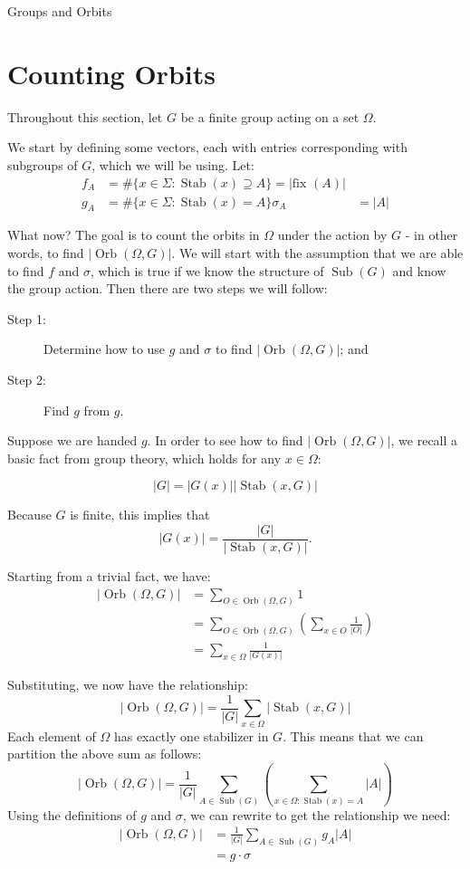 \documentclass[12pt]{pom_thesis}
\newcommand{\fix}{\text{fix }}
\DeclareMathOperator{\sub}{Sub}
\DeclareMathOperator{\stab}{Stab}
\DeclareMathOperator{\orb}{Orb}
\begin{document}
\begin{chapter}{Groups and Orbits}
\section{Counting Orbits}
Throughout this section, let $G$ be a finite group acting on a set $\Omega$.

We start by defining some vectors, each with entries corresponding with subgroups of $G$, which we will be using. Let:
\begin{align*}
f_A &= \#\{x \in \Sigma: \stab(x) \supseteq A\} = |\fix(A)|\\
g_A &= \#\{x \in \Sigma: \stab(x) = A\}
\sigma_A &= |A|
\end{align*}

What now? The goal is to count the orbits in $\Omega$ under the action by $G$ - in other words, to find $|\orb(\Omega, G)|$. We will start with the assumption that we are able to find $f$ and $\sigma$, which is true if we know the structure of $\sub(G)$ and know the group action. Then there are two steps we will follow:
\begin{description}
\item[Step 1:] Determine how to use $g$ and $\sigma$ to find $|\orb(\Omega, G)|$; and
\item[Step 2:] Find $g$ from $g$.
\end{description}

Suppose we are handed $g$. In order to see how to find $|\orb(\Omega, G)|$, we recall a basic fact from group theory, which holds for any $x \in \Omega$:
\begin{fact}
\[|G| = |G(x)||\stab(x, G)|\]
\end{fact}
Because $G$ is finite, this implies that \[|G(x)| = \frac{|G|}{|\stab(x, G)|}.\]

Starting from a trivial fact, we have:
\begin{align*}
|\orb(\Omega, G)| &= \sum_{O \in \orb(\Omega, G)}1\\
&= \sum_{O \in \orb(\Omega, G)}\left(\sum_{x \in O}\frac{1}{|O|}\right)\\
&= \sum_{x \in \Omega}\frac{1}{|G(x)|}
\end{align*}

Substituting, we now have the relationship:
\[
|\orb(\Omega, G)| = \frac{1}{|G|}\sum_{x \in \Omega}|\stab(x, G)|
\]
Each element of $\Omega$ has exactly one stabilizer in $G$. This means that we can partition the above sum as follows:
\[
|\orb(\Omega, G)| = \frac{1}{|G|}\sum_{A \in \sub(G)}\left(\sum_{x \in \Omega: \stab(x) = A}|A|\right)
\]
Using the definitions of $g$ and $\sigma$, we can rewrite to get the relationship we need:
\begin{align*}
|\orb(\Omega, G)| &= \frac{1}{|G|}\sum_{A \in \sub(G)}g_A|A|\\
&= g \cdot \sigma
\end{align*}


\end{chapter}
\end{document}
